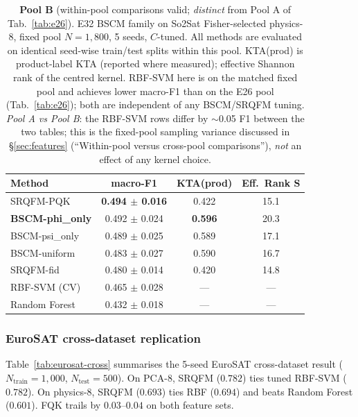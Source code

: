 \documentclass[pdflatex,sn-mathphys]{sn-jnl}
\theoremstyle{plain}
\theoremstyle{remark}
\theoremstyle{definition}
\begin{document}
\begin{table}[htbp]
\caption{\textbf{Pool B} (within-pool comparisons valid; \emph{distinct} from Pool A of Tab.~\ref{tab:e26}). E32 BSCM family on So2Sat Fisher-selected physics-8, fixed pool $N=1{,}800$, 5 seeds, $C$-tuned. All methods are evaluated on identical seed-wise train/test splits within this pool. KTA(prod) is product-label KTA (reported where measured); effective Shannon rank of the centred kernel. RBF-SVM here is on the matched fixed pool and achieves lower macro-F1 than on the E26 pool (Tab.~\ref{tab:e26}); both are independent of any BSCM/SRQFM tuning.  \emph{Pool A vs Pool B}: the RBF-SVM rows differ by $\sim$0.05 F1 between the two tables; this is the fixed-pool sampling variance discussed in \S\ref{sec:features} (``Within-pool versus cross-pool comparisons''), \emph{not} an effect of any kernel choice.}
\label{tab:bscm-so2sat}
\begin{tabular}{lccc}
\toprule
Method & macro-F1 & KTA(prod) & Eff.\ Rank S \\
\midrule
SRQFM-PQK           & \textbf{0.494 $\pm$ 0.016} & 0.422 & 15.1 \\
\textbf{BSCM-phi\_only} & 0.492 $\pm$ 0.024 & \textbf{0.596} & 20.3 \\
BSCM-psi\_only      & 0.489 $\pm$ 0.025 & 0.589 & 17.1 \\
BSCM-uniform        & 0.483 $\pm$ 0.027 & 0.590 & 16.7 \\
SRQFM-fid           & 0.480 $\pm$ 0.014 & 0.420 & 14.8 \\
RBF-SVM (CV)        & 0.465 $\pm$ 0.028 & ---   & --- \\
Random Forest       & 0.432 $\pm$ 0.018 & ---   & --- \\
\bottomrule
\end{tabular}
\end{table}

\subsubsection{EuroSAT cross-dataset replication}\label{sec:eurosat-cross}
Table~\ref{tab:eurosat-cross} summarises the 5-seed EuroSAT cross-dataset result ($N_\text{train}=1{,}000$, $N_\text{test}=500$). On PCA-8, SRQFM ($0.782$) ties tuned RBF-SVM ($0.782$). On physics-8, SRQFM ($0.693$) ties RBF ($0.694$) and beats Random Forest ($0.601$). FQK trails by $0.03$--$0.04$ on both feature sets.
\end{document}
